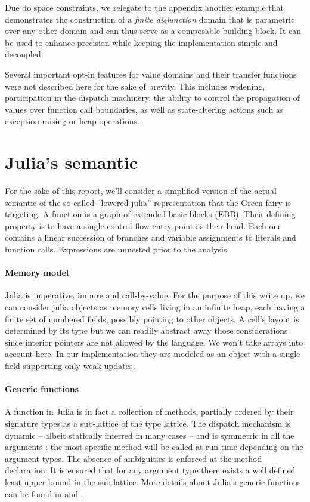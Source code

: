 \documentclass[11pt]{article}
\begin{document}
Due do space constraints, we relegate to the appendix another example that demonstrates the construction of a \emph{finite disjunction} domain that is parametric over any other domain and can thus serve as a composable building block. It can be used to enhance precision while keeping the implementation simple and decoupled.

Several important opt-in features for value domains and their transfer functions were not described here for the sake of brevity. This includes widening, participation in the dispatch machinery, the ability to control the propagation of values over function call boundaries, as well as state-altering actions such as exception raising or heap operations.

\section*{Julia's semantic}

For the sake of this report, we'll consider a simplified version of the actual semantic of the so-called ``lowered julia'' representation that the Green fairy is targeting.
A function is a graph of extended basic blocks (EBB). Their defining property is to have a single control flow entry point as their head. Each one contains a linear succession of branches and variable assignments to literals and function calls.
Expressions are unnested prior to the analysis.

\paragraph{Memory model} Julia is imperative, impure and call-by-value.
For the purpose of this write up, we can consider julia objects as memory cells living in an infinite heap, each having a finite set of numbered fields, possibly pointing to other objects.
A cell's layout is determined by its type but we can readily abstract away those considerations since interior pointers are not allowed by the language.
We won't take arrays into account here. In our implementation they are modeled as an object with a single field supporting only weak updates.

\paragraph{Generic functions} A function in Julia is in fact a collection of methods, partially ordered by their signature types as a sub-lattice of the type lattice.
The dispatch mechanism is dynamic -- albeit statically inferred in many cases -- and is symmetric in all the arguments : the most specific method will be called at run-time depending on the argument types.
The absence of ambiguities is enforced at the method declaration.
It is ensured that for any argument type there exists a well defined least upper bound in the sub-lattice.
More details about Julia's generic functions can be found in \cite{julia-paper} and \cite{jeff-phd}.
\end{document}
